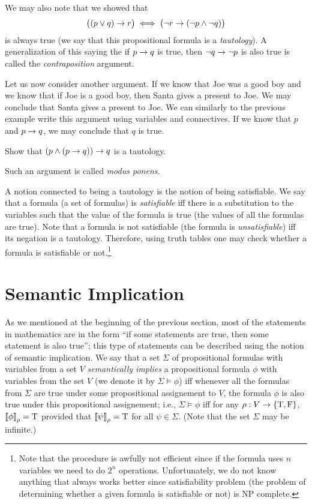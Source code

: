 We may also note that we showed that
\[
  \bigl((p \lor q) \rightarrow r\bigr) \iff
  \bigl(\lnot r \rightarrow (\lnot p \land \lnot q) \bigr)
\]
is always true (we say that this propositional formula is a
\emph{tautology}). A generalization of this saying the if $p \rightarrow q$ is
true, then $\lnot q \rightarrow \lnot p$ is also true is called the
\emph{contraposition} argument.

Let us now consider another argument. If we know that Joe was a good boy and we
know that if Joe is a good boy, then Santa gives a present to Joe. We may
conclude that Santa gives a present to Joe. We can similarly to the previous
example write this argument using variables and connectives.
If we know that $p$ and $p \rightarrow q$, we may conclude that $q$ is true.
\begin{exercise}
  Show that $(p \land (p \rightarrow q)) \rightarrow q$ is a tautology.
\end{exercise}
Such an argument is called \emph{modus ponens}.

A notion connected to being a tautology is the notion of being satisfiable.
We say that a formula (a set of formulas) is \emph{satisfiable} iff there
is a substitution to the variables such that the value of the formula is true
(the values of all the formulas are true). Note that a formula is not
satisfiable (the formula is \emph{unsatisfiable}) iff its negation is
a tautology. Therefore, using truth tables one may check whether a formula
is satisfiable or not.\footnote{%
  Note that the procedure is awfully not efficient since if the formula
  uses $n$ variables we need to do $2^n$ operations. Unfortunately,
  we do not know anything that always works better since
  satisfiability problem (the problem of determining whether a given formula is
  satisfiable or not) is NP complete.
}

\section{Semantic Implication}
As we mentioned at the beginning of the previous section, most of the
statements in mathematics are in the form
``if some statements are true, then some statement is also true'';
this type of statements can be described using the notion of semantic
implication. We say that a set $\Sigma$ of propositional formulas with
variables from a set $V$ \emph{semantically implies} a propositional formula
$\phi$ with variables from the set $V$ (we denote it by $\Sigma \models \phi$)
iff whenever all the formulas from $\Sigma$ are true under some propositional
assignement to $V$, the formula $\phi$ is also true under this propositional
assignement; i.e.,
$\Sigma \models \phi$ iff for any $\rho : V \to \set{\ltrue, \lfalse}$,
$\left\llbracket {\phi} \right\rrbracket_{\rho} = \text{T}$ provided that
$\left\llbracket {\psi} \right\rrbracket_{\rho} = \text{T}$ for all $\psi \in \Sigma$.
(Note that the set $\Sigma$ may be infinite.)

